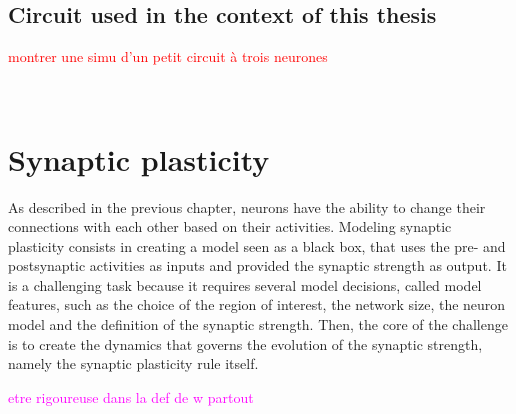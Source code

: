 \subsection{Circuit used in the context of this thesis}
\textcolor{red}{montrer une simu d'un petit circuit à trois neurones}

~\\
\newpage

%
%

\section{Synaptic plasticity}
As described in the previous chapter, neurons have the ability to change their connections with each other based on their activities. Modeling synaptic plasticity consists in creating a model seen as a black box, that uses the pre- and postsynaptic activities as inputs and provided the synaptic strength as output. It is a challenging task because it requires several model decisions, called model features,  such as the choice of the region of interest, the network size, the neuron model and the definition of the synaptic strength. Then, the core of the challenge is to create the dynamics that governs the evolution of the synaptic strength, namely the synaptic plasticity rule itself. 

\textcolor{magenta}{etre rigoureuse dans la def de w partout}


